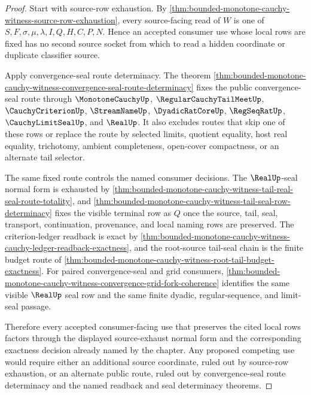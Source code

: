\begin{proof}
Start with source-row exhaustion. By \autoref{thm:bounded-monotone-cauchy-witness-source-row-exhaustion}, every source-facing read of $W$ is one of $S,F,\sigma,\mu,\lambda,I,Q,H,C,P,N$. Hence an accepted consumer use whose local rows are fixed has no second source socket from which to read a hidden coordinate or duplicate classifier source.

Apply convergence-seal route determinacy. The theorem \autoref{thm:bounded-monotone-cauchy-witness-convergence-seal-route-determinacy} fixes the public convergence-seal route through $\MonotoneCauchyUp$, $\RegularCauchyTailMeetUp$, $\CauchyCriterionUp$, $\StreamNameUp$, $\DyadicRatCoreUp$, $\RegSeqRatUp$, $\CauchyLimitSealUp$, and $\RealUp$. It also excludes routes that skip one of these rows or replace the route by selected limits, quotient equality, host real equality, trichotomy, ambient completeness, open-cover compactness, or an alternate tail selector.

The same fixed route controls the named consumer decisions. The $\RealUp$-seal normal form is exhausted by \autoref{thm:bounded-monotone-cauchy-witness-tail-real-seal-route-totality}, and \autoref{thm:bounded-monotone-cauchy-witness-tail-seal-row-determinacy} fixes the visible terminal row as $Q$ once the source, tail, seal, transport, continuation, provenance, and local naming rows are preserved. The criterion-ledger readback is exact by \autoref{thm:bounded-monotone-cauchy-witness-cauchy-ledger-readback-exactness}, and the root-source tail-seal chain is the finite budget route of \autoref{thm:bounded-monotone-cauchy-witness-root-tail-budget-exactness}. For paired convergence-seal and grid consumers, \autoref{thm:bounded-monotone-cauchy-witness-convergence-grid-fork-coherence} identifies the same visible $\RealUp$ seal row and the same finite dyadic, regular-sequence, and limit-seal passage.

Therefore every accepted consumer-facing use that preserves the cited local rows factors through the displayed source-exhaust normal form and the corresponding exactness decision already named by the chapter. Any proposed competing use would require either an additional source coordinate, ruled out by source-row exhaustion, or an alternate public route, ruled out by convergence-seal route determinacy and the named readback and seal determinacy theorems.
\end{proof}
